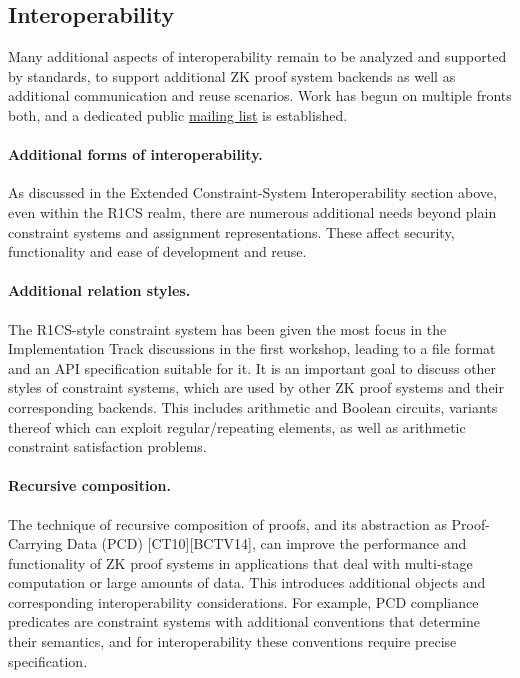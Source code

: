 \subsection{Interoperability}

Many additional aspects of interoperability remain to be analyzed and supported by standards, to support additional ZK proof system backends as well as additional communication and reuse scenarios. Work has begun on multiple fronts both, and a dedicated public \href{https://groups.google.com/a/zkproof.org/forum/\#!forum/interoperability}{mailing list} is established.

\paragraph{Additional forms of interoperability.}
As discussed in the Extended Constraint-System Interoperability section above, even within the R1CS realm, there are numerous additional needs beyond plain constraint systems and assignment representations. These affect security, functionality and ease of development and reuse.


\paragraph{Additional relation styles.}
The R1CS-style constraint system has been given the most focus in the Implementation Track discussions in the first workshop, leading to a file format and an API specification suitable for it. It is an important goal to discuss other styles of constraint systems, which are used by other ZK proof systems and their corresponding backends. This includes arithmetic and Boolean circuits, variants thereof which can exploit regular/repeating elements, as well as arithmetic constraint satisfaction problems.


\paragraph{Recursive composition.}
The technique of recursive composition of proofs, and its abstraction as Proof-Carrying Data (PCD) [CT10][BCTV14], can improve the performance and functionality of ZK proof systems in applications that deal with multi-stage computation or large amounts of data. This introduces additional objects and corresponding interoperability considerations. For example, PCD compliance predicates are constraint systems with additional conventions that determine their semantics, and for interoperability these conventions require precise specification.


